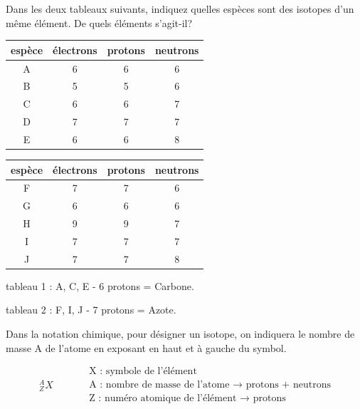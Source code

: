 \documentclass[
  11pt,
  a4paper,
  openany]{book}
\begin{document}
\begin{Exercise}
Dans les deux tableaux suivants, indiquez quelles espèces sont des isotopes d'un même élément. De quels éléments s'agit-il?

\end{Exercise}

\begin{longtable}[]{@{}cccc@{}}
\toprule()
espèce & électrons & protons & neutrons \\
\midrule()
\endhead
A & 6 & 6 & 6 \\
B & 5 & 5 & 6 \\
C & 6 & 6 & 7 \\
D & 7 & 7 & 7 \\
E & 6 & 6 & 8 \\
\bottomrule()
\end{longtable}

\begin{longtable}[]{@{}cccc@{}}
\toprule()
espèce & électrons & protons & neutrons \\
\midrule()
\endhead
F & 7 & 7 & 6 \\
G & 6 & 6 & 6 \\
H & 9 & 9 & 7 \\
I & 7 & 7 & 7 \\
J & 7 & 7 & 8 \\
\bottomrule()
\end{longtable}

\begin{Answer}

tableau 1 : A, C, E - 6 protons = Carbone.

tableau 2 : F, I, J - 7 protons = Azote.

\newpage

\end{Answer}

Dans la notation chimique, pour désigner un isotope, on indiquera le nombre de masse A de l'atome en exposant en haut et à gauche du symbol.

\[ \begin{split}
  _{Z}^{A}X
  \end{split}
  \qquad
  \begin{split}
  & \text{X : symbole de l'élément} \\
    & \text{A : nombre de masse de l'atome $\rightarrow$ protons + neutrons} \\
    & \text{Z : numéro atomique de l'élément $\rightarrow$ protons}
  \end{split} \]
\end{document}
